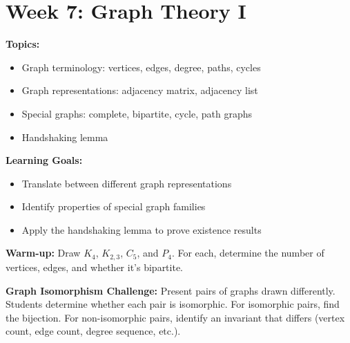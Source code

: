 \documentclass[11pt]{article}
\begin{document}
\newpage
\section{Week 7: Graph Theory I}

\begin{classabox}
\textbf{Topics:}
\begin{itemize}
    \item Graph terminology: vertices, edges, degree, paths, cycles
    \item Graph representations: adjacency matrix, adjacency list
    \item Special graphs: complete, bipartite, cycle, path graphs
    \item Handshaking lemma
\end{itemize}

\textbf{Learning Goals:}
\begin{itemize}
    \item Translate between different graph representations
    \item Identify properties of special graph families
    \item Apply the handshaking lemma to prove existence results
\end{itemize}

\textbf{Warm-up:} Draw $K_4$, $K_{2,3}$, $C_5$, and $P_4$. For each, determine the number of vertices, edges, and whether it's bipartite.
\end{classabox}

\begin{activitybox}
\textbf{Graph Isomorphism Challenge:} Present pairs of graphs drawn differently. Students determine whether each pair is isomorphic. For isomorphic pairs, find the bijection. For non-isomorphic pairs, identify an invariant that differs (vertex count, edge count, degree sequence, etc.).
\end{activitybox}
\end{document}
